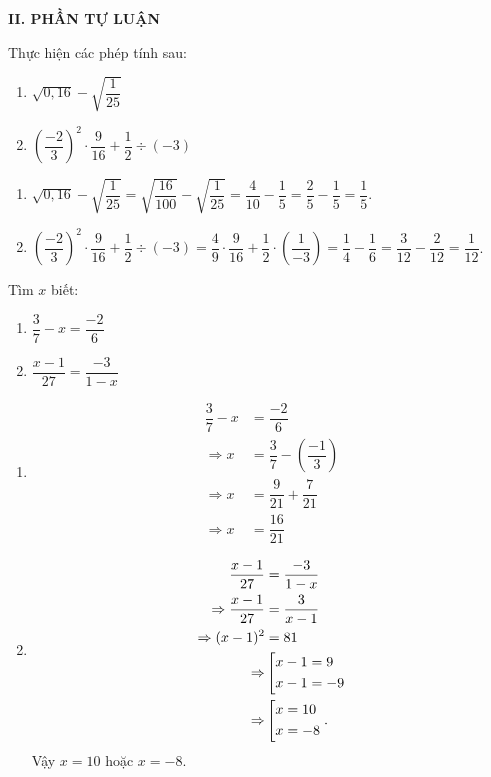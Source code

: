 	\noindent\textbf{II. PHẦN TỰ LUẬN}
	\setcounter{ex}{0}
		\begin{ex}%
			Thực hiện các phép tính sau:
			\begin{enumerate}
				\item $\sqrt{0{,}16}-\sqrt{\dfrac{1}{25}}$
				\item $\left(\dfrac{-2}{3} \right)^2\cdot \dfrac{9}{16}+\dfrac{1}{2}\div (-3) $
			\end{enumerate}
			\loigiai
			{
					\begin{enumerate}
						\item $\sqrt{0{,}16}-\sqrt{\dfrac{1}{25}}=\sqrt{\dfrac{16}{100}}-\sqrt{\dfrac{1}{25}}=\dfrac{4}{10}-\dfrac{1}{5}=\dfrac{2}{5}-\dfrac{1}{5}=\dfrac{1}{5}$.
						\item $\left(\dfrac{-2}{3} \right)^2\cdot \dfrac{9}{16}+\dfrac{1}{2}\div (-3)=\dfrac{4}{9}\cdot\dfrac{9}{16}+\dfrac{1}{2}\cdot \left(\dfrac{1}{-3}\right) =\dfrac{1}{4}-\dfrac{1}{6}=\dfrac{3}{12}-\dfrac{2}{12}=\dfrac{1}{12}$.
					\end{enumerate}
			}
		\end{ex}
		
		\begin{ex}%
			Tìm $x$ biết:
			\begin{enumerate}
				\item $\dfrac{3}{7}-x=\dfrac{-2}{6}$
				\item $\dfrac{x-1}{27}=\dfrac{-3}{1-x}$
			\end{enumerate}
			\loigiai
			{
				\begin{enumerate}
					\item 
\begin{align*}				
					\dfrac{3}{7}-x&=\dfrac{-2}{6}\\
							\Rightarrow x&=\dfrac{3}{7}-\left(\dfrac{-1}{3}\right)\\
							\Rightarrow x&=\dfrac{9}{21}+\dfrac{7}{21}\\
							\Rightarrow x&=\dfrac{16}{21}
\end{align*}
					\item 
		\begin{align*}			\dfrac{x-1}{27}&=\dfrac{-3}{1-x}\\
							\Rightarrow \dfrac{x-1}{27}&=\dfrac{3}{x-1}\\
							\Rightarrow (x-1)^2&=81\\
							\Rightarrow & \left[\begin{aligned}&x-1 = 9\\&x-1=-9\end{aligned}\right.\\
							\Rightarrow &\left[\begin{aligned}&x=10\\&x=-8\end{aligned}\right..
		\end{align*}
		Vậy $x=10$ hoặc $x=-8$.
				\end{enumerate}
			}
		\end{ex}
	
